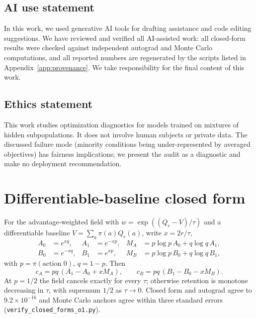 \documentclass{article}
\begin{document}
\subsection*{AI use statement}

In this work, we used generative AI tools for drafting assistance and code
editing suggestions. We have reviewed and verified all AI-assisted work: all
closed-form results were checked against independent autograd and Monte Carlo
computations, and all reported numbers are regenerated by the scripts listed
in Appendix~\ref{app:provenance}. We take responsibility for the final
content of this work.

\subsection*{Ethics statement}

This work studies optimization diagnostics for models trained on mixtures of
hidden subpopulations. It does not involve human subjects or private data. The
discussed failure mode (minority conditions being under-represented by
averaged objectives) has fairness implications; we present the audit as a
diagnostic and make no deployment recommendation.




\appendix

\section{Differentiable-baseline closed form}
\label{app:awr}

For the advantage-weighted field with $w=\exp((Q_r-V)/\tau)$ and a
differentiable baseline $V=\sum_a\pi(a)Q_r(a)$, write $x=2r/\tau$,
\begin{align}
A_0&=e^{xq}, & A_1&=e^{-xp}, & M_A&=p\log p\,A_0+q\log q\,A_1, \\
B_0&=e^{-xq}, & B_1&=e^{xp}, & M_B&=p\log p\,B_0+q\log q\,B_1,
\end{align}
with $p=\pi(\text{action }0)$, $q=1-p$. Then
\begin{equation}
c_A = pq\,(A_1-A_0+xM_A), \qquad
c_B = pq\,(B_1-B_0-xM_B).
\end{equation}
At $p=1/2$ the field cancels exactly for every $\tau$; otherwise retention
is monotone decreasing in $\tau$, with supremum $1/2$ as $\tau\to0$. Closed
form and autograd agree to
$9.2\times10^{-16}$ and Monte Carlo anchors agree within three standard
errors (\texttt{verify\_closed\_forms\_o1.py}).
\end{document}
